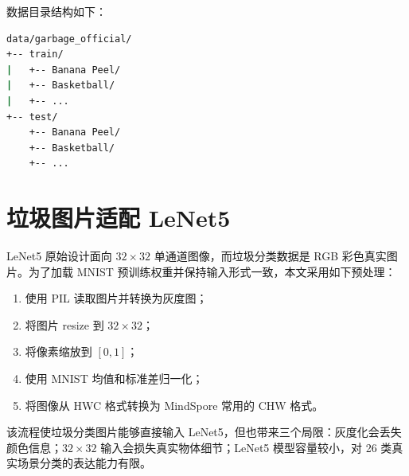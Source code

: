 数据目录结构如下：

\begin{lstlisting}[language=bash,numbers=none]
data/garbage_official/
+-- train/
|   +-- Banana Peel/
|   +-- Basketball/
|   +-- ...
+-- test/
    +-- Banana Peel/
    +-- Basketball/
    +-- ...
\end{lstlisting}

\section{垃圾图片适配 LeNet5}

LeNet5 原始设计面向 $32\times32$ 单通道图像，而垃圾分类数据是 RGB 彩色真实图片。为了加载 MNIST 预训练权重并保持输入形式一致，本文采用如下预处理：

\begin{enumerate}[label=(\arabic*)]
  \item 使用 PIL 读取图片并转换为灰度图；
  \item 将图片 resize 到 $32\times32$；
  \item 将像素缩放到 $[0,1]$；
  \item 使用 MNIST 均值和标准差归一化；
  \item 将图像从 HWC 格式转换为 MindSpore 常用的 CHW 格式。
\end{enumerate}

该流程使垃圾分类图片能够直接输入 LeNet5，但也带来三个局限：灰度化会丢失颜色信息；$32\times32$ 输入会损失真实物体细节；LeNet5 模型容量较小，对 26 类真实场景分类的表达能力有限。
